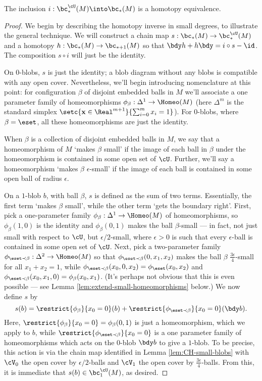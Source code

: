 \begin{thm}
The inclusion $i: \bc^{\cU}_*(M) \into \bc_*(M)$ is a homotopy equivalence.
\end{thm}
\begin{proof}
We begin by describing the homotopy inverse in small degrees, to illustrate the general technique.
We will construct a chain map $s:  \bc_*(M) \to \bc^{\cU}_*(M)$ and a homotopy $h:\bc_*(M) \to \bc_{*+1}(M)$ so that $\bdy h+h \bdy=i\circ s - \id$. The composition $s \circ i$ will just be the identity.

On $0$-blobs, $s$ is just the identity; a blob diagram without any blobs is compatible with any open cover. Nevertheless, we'll begin introducing nomenclature at this point: for configuration $\beta$ of disjoint embedded balls in $M$ we'll associate a one parameter family of homeomorphisms $\phi_\beta : \Delta^1 \to \Homeo(M)$ (here $\Delta^m$ is the standard simplex $\setc{\mathbf{x} \in \Real^{m+1}}{\sum_{i=0}^m x_i = 1}$). For $0$-blobs, where $\beta = \eset$, all these homeomorphisms are just the identity.

When $\beta$ is a collection of disjoint embedded balls in $M$, we say that a homeomorphism of $M$ `makes $\beta$ small' if the image of each ball in $\beta$ under the homeomorphism is contained in some open set of $\cU$. Further, we'll say a homeomorphism `makes $\beta$ $\epsilon$-small' if the image of each ball is contained in some open ball of radius $\epsilon$.

On a $1$-blob $b$, with ball $\beta$, $s$ is defined as the sum of two terms. Essentially, the first term `makes $\beta$ small', while the other term `gets the boundary right'. First, pick a one-parameter family $\phi_\beta : \Delta^1 \to \Homeo(M)$ of homeomorphisms, so $\phi_\beta(1,0)$ is the identity and $\phi_\beta(0,1)$ makes the ball $\beta$-small --- in fact, not just small with respect to $\cU$, but $\epsilon/2$-small, where $\epsilon > 0$ is such that every $\epsilon$-ball is contained in some open set of $\cU$. Next, pick a two-parameter family $\phi_{\eset \prec \beta} : \Delta^2 \to \Homeo(M)$ so that $\phi_{\eset \prec \beta}(0,x_1,x_2)$ makes the ball $\beta$ $\frac{3\epsilon}{4}$-small for all $x_1+x_2=1$, while $\phi_{\eset \prec \beta}(x_0,0,x_2) = \phi_\eset(x_0,x_2)$ and $\phi_{\eset \prec \beta}(x_0,x_1,0) = \phi_\beta(x_0,x_1)$. (It's perhaps not obvious that this is even possible --- see Lemma \ref{lem:extend-small-homeomorphisms} below.) We now define $s$ by
$$s(b) = \restrict{\phi_\beta}{x_0=0}(b) + \restrict{\phi_{\eset \prec \beta}}{x_0=0}(\bdy b).$$
Here, $\restrict{\phi_\beta}{x_0=0} = \phi_\beta(0,1)$ is just a homeomorphism, which we apply to $b$, while $\restrict{\phi_{\eset \prec \beta}}{x_0=0}$ is a one parameter family of homeomorphisms which acts on the $0$-blob $\bdy b$ to give a $1$-blob. To be precise, this action is via the chain map identified in Lemma \ref{lem:CH-small-blobs} with $\cV_0$ the open cover by $\epsilon/2$-balls and $\cV_1$ the open cover by $\frac{3\epsilon}{4}$-balls. From this, it is immediate that $s(b) \in \bc^{\cU}_1(M)$, as desired.


\end{proof}
